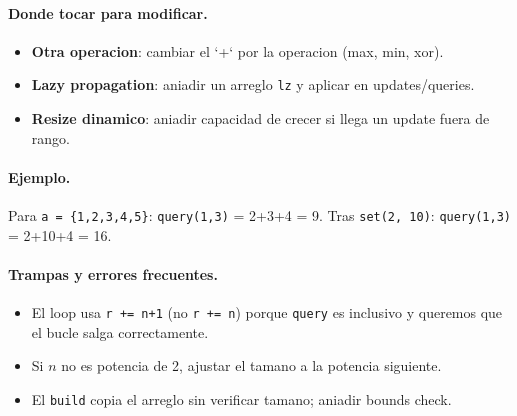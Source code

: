 \paragraph{Donde tocar para modificar.}
\begin{itemize}\setlength\itemsep{0pt}
	\item \textbf{Otra operacion}: cambiar el `+` por la operacion (max, min, xor).
	\item \textbf{Lazy propagation}: aniadir un arreglo \texttt{lz} y aplicar en updates/queries.
	\item \textbf{Resize dinamico}: aniadir capacidad de crecer si llega un update fuera de rango.
\end{itemize}

\paragraph{Ejemplo.}
Para \texttt{a = \{1,2,3,4,5\}}: \texttt{query(1,3)} = 2+3+4 = 9. Tras \texttt{set(2, 10)}: \texttt{query(1,3)} = 2+10+4 = 16.

\paragraph{Trampas y errores frecuentes.}
\begin{itemize}\setlength\itemsep{0pt}
	\item El loop usa \texttt{r += n+1} (no \texttt{r += n}) porque \texttt{query} es inclusivo y queremos que el bucle salga correctamente.
	\item Si $n$ no es potencia de 2, ajustar el tamano a la potencia siguiente.
		\item El \texttt{build} copia el arreglo sin verificar tamano; aniadir bounds check.
\end{itemize}

